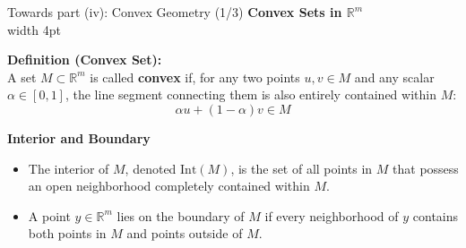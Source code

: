 \documentclass[10pt, aspectratio=169, xcolor=dvipsnames]{beamer}
\newcommand{\lead}[1]{{\color{UniBlue}\bfseries #1}}
\begin{document}
\begin{frame}{Towards part (iv): Convex Geometry (1/3)}
    \lead{Convex Sets in $\mathbb{R}^m$}\\
    \vspace{0.2cm}
    \noindent
    {\color{Teal}\vrule width 4pt}%
    \hspace{10pt}%
    \begin{minipage}{\dimexpr\textwidth-14pt\relax}
        \color{Slate}
        \textbf{Definition (Convex Set):}\\
        \vspace{0.1cm}
        A set $M \subset \mathbb{R}^m$ is called \textbf{convex} if, for any two points $u, v \in M$ and any scalar $\alpha \in [0,1]$, the line segment connecting them is also entirely contained within $M$:
        \[ \alpha u + (1-\alpha) v \in M \]
    \end{minipage}

    \vspace{0.6cm}
    \lead{Interior and Boundary}\\
    \vspace{0.2cm}
    \begin{itemize}
        \item[{ \tikz\fill[Teal] (0,0) circle (2pt); }] The interior of $M$, denoted $\text{Int}(M)$, is the set of all points in $M$ that possess an open neighborhood completely contained within $M$.
        \vspace{0.2cm}
        \item[{ \tikz\fill[Teal] (0,0) circle (2pt); }] A point $y \in \mathbb{R}^m$ lies on the boundary of $M$ if every neighborhood of $y$ contains both points in $M$ and points outside of $M$.
    \end{itemize}
\end{frame}
\end{document}
